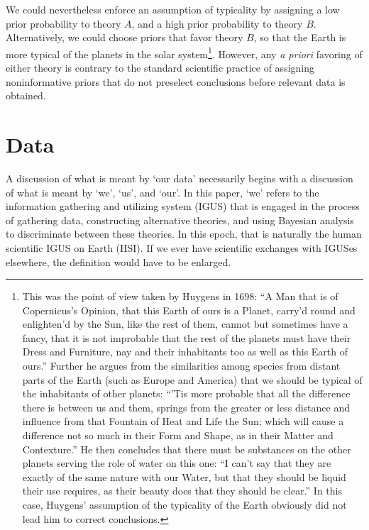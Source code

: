 \documentclass[pra,floatfix,preprint,nofootinbib,12pt]{revtex4}
\begin{document}
We could nevertheless enforce an assumption of typicality by assigning a low prior probability to 
theory $A$, and a high prior probability to theory $B$.  Alternatively, we could choose priors that favor theory $B$, so that the Earth is more typical of the planets in the solar system\footnote{
This was the point of view taken by  Huygens \cite{Huy1698} in 1698:
``A Man that is of Copernicus's Opinion, that this Earth of ours is a Planet, carry'd round and enlighten'd by the Sun, like the rest of them, cannot but sometimes have a fancy, that it is not improbable that the rest of the planets must have their Dress and Furniture, nay and their inhabitants too as well as this Earth of ours.''  Further he argues from the similarities among species from distant parts of the Earth (such as Europe and America) that we should be typical of the inhabitants of other planets: ``'Tis more probable that all the difference there is between us and them, springs from the greater or less distance and influence from that Fountain of Heat and Life the Sun; which will cause a difference not so much in their Form and Shape, as in their Matter and Contexture.''  He then concludes that there must be 
substances on the other planets serving the role of water on this one: ``I can't say that they are exactly of the same nature with our Water, but that they should be liquid their use requires, as their beauty does that they should be clear.''  In this case, Huygens' assumption of the typicality of the Earth obviously did not lead him to correct conclusions.}.  
However, any {\it a priori\/} favoring of either theory is contrary to the standard 
scientific practice of assigning noninformative priors that do not preselect conclusions before relevant data is obtained.

\section{Data}  
\label{Data}

A discussion of what is meant by `our data' necessarily begins with a discussion of what is meant by `we', `us', and `our'. In this paper, `we' refers to the information gathering and utilizing system (IGUS) that is engaged in the process of gathering data, constructing alternative theories, and using Bayesian analysis to discriminate between these theories. In this epoch, that is naturally the human scientific IGUS on Earth (HSI). If we ever have scientific exchanges with IGUSes 
elsewhere, the definition would have to be enlarged. 
\end{document}
